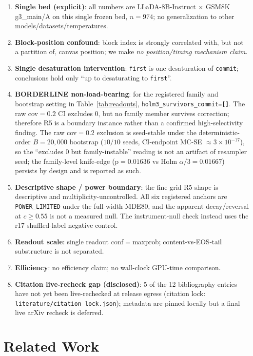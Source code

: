 \documentclass{article}
\begin{document}
\begin{enumerate}
  \item \textbf{Single bed (explicit)}: all numbers are LLaDA-8B-Instruct $\times$ GSM8K g3\_main/A
  on this single frozen bed, $n{=}974$; no generalization to other models/datasets/temperatures.
  \item \textbf{Block-position confound}: block index is strongly correlated with, but not a
  partition of, canvas position; we make \emph{no position/timing mechanism claim}.
  \item \textbf{Single desaturation intervention}: \texttt{first} is one desaturation of
  \texttt{commit}; conclusions hold only ``up to desaturating to \texttt{first}''.
  \item \textbf{BORDERLINE non-load-bearing}\label{lim:mcnoise}: for the registered family
  and bootstrap setting in Table~\ref{tab:readouts},
  \texttt{holm3\_survivors\_commit=[]}. The raw cov$=0.2$ CI excludes 0, but no family
  member survives correction; therefore R5 is a boundary instance rather than a confirmed
  high-selectivity finding. The raw cov$=0.2$ exclusion is seed-stable under the
  deterministic-order $B{=}20{,}000$ bootstrap ($10/10$ seeds, CI-endpoint MC-SE
  $\approx3{\times}10^{-17}$), so the ``excludes $0$ but family-instable'' reading is not an
  artifact of resampler seed; the family-level knife-edge (p$=0.01636$ vs Holm $\alpha/3{=}0.01667$)
  persists by design and is reported as such.
  \item \textbf{Descriptive shape / power boundary}: the fine-grid R5 shape is descriptive
  and multiplicity-uncontrolled. All six registered anchors are \texttt{POWER\_LIMITED}
  under the full-width MDE80, and the apparent decay/reversal at $c\ge0.55$ is not a measured
  null. The instrument-null check instead uses the r17 shuffled-label negative control.
  \item \textbf{Readout scale}: single readout conf${=}$maxprob; content-vs-EOS-tail substructure
  is not separated.
  \item \textbf{Efficiency}: no efficiency claim; no wall-clock GPU-time comparison.
  \item \textbf{Citation live-recheck gap (disclosed)}: 5 of the 12 bibliography entries have
  not yet been live-rechecked at release egress (citation lock:
  \texttt{literature/citation\_lock.json}); metadata are pinned locally but a final live
  arXiv recheck is deferred.
\end{enumerate}

\section{Related Work}
\label{sec:related}
\end{document}
